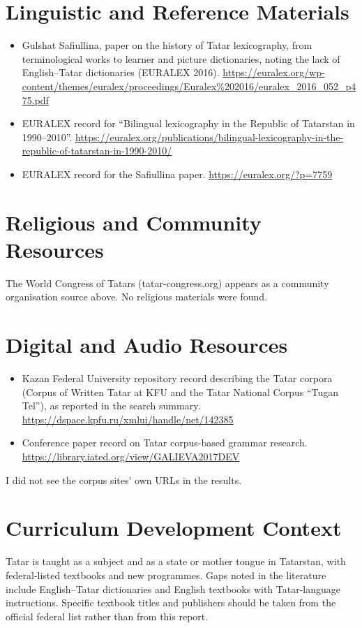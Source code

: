 \documentclass[12pt]{article}
\begin{document}
\section{Linguistic and Reference Materials}
\begin{itemize}
\item Gulshat Safiullina, paper on the history of Tatar lexicography, from terminological works to learner and picture dictionaries, noting the lack of English--Tatar dictionaries (EURALEX 2016). \url{https://euralex.org/wp-content/themes/euralex/proceedings/Euralex%202016/euralex_2016_052_p475.pdf}
\item EURALEX record for ``Bilingual lexicography in the Republic of Tatarstan in 1990--2010''. \url{https://euralex.org/publications/bilingual-lexicography-in-the-republic-of-tatarstan-in-1990-2010/}
\item EURALEX record for the Safiullina paper. \url{https://euralex.org/?p=7759}
\end{itemize}

\section{Religious and Community Resources}
The World Congress of Tatars (tatar-congress.org) appears as a community organisation source above. No religious materials were found.

\section{Digital and Audio Resources}
\begin{itemize}
\item Kazan Federal University repository record describing the Tatar corpora (Corpus of Written Tatar at KFU and the Tatar National Corpus ``Tugan Tel''), as reported in the search summary. \url{https://dspace.kpfu.ru/xmlui/handle/net/142385}
\item Conference paper record on Tatar corpus-based grammar research. \url{https://library.iated.org/view/GALIEVA2017DEV}
\end{itemize}
I did not see the corpus sites' own URLs in the results.

\section{Curriculum Development Context}
Tatar is taught as a subject and as a state or mother tongue in Tatarstan, with federal-listed textbooks and new programmes. Gaps noted in the literature include English--Tatar dictionaries and English textbooks with Tatar-language instructions. Specific textbook titles and publishers should be taken from the official federal list rather than from this report.
\end{document}
